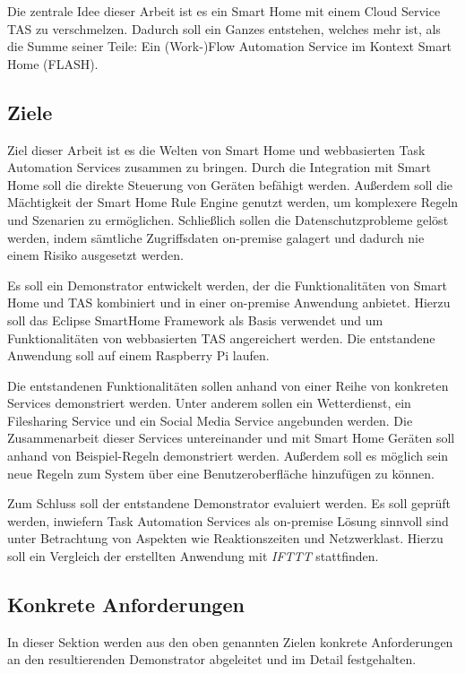 Die zentrale Idee dieser Arbeit ist es ein Smart Home mit einem Cloud Service TAS zu verschmelzen. Dadurch soll ein Ganzes entstehen, welches mehr ist, als die Summe seiner Teile: Ein (Work-)Flow Automation Service im Kontext Smart Home (FLASH).

\subsection{Ziele}
\label{sec:ziele}
Ziel dieser Arbeit ist es die Welten von Smart Home und webbasierten Task Automation Services zusammen zu bringen. Durch die Integration mit Smart Home soll die direkte Steuerung von Geräten befähigt werden. Außerdem soll die Mächtigkeit der Smart Home Rule Engine genutzt werden, um komplexere Regeln und Szenarien zu ermöglichen. Schließlich sollen die Datenschutzprobleme gelöst werden, indem sämtliche Zugriffsdaten on-premise galagert und dadurch nie einem Risiko ausgesetzt werden.

Es soll ein Demonstrator entwickelt werden, der die Funktionalitäten von Smart Home und TAS kombiniert und in einer on-premise Anwendung anbietet. Hierzu soll das Eclipse SmartHome Framework als Basis verwendet und um Funktionalitäten von webbasierten TAS angereichert werden. Die entstandene Anwendung soll auf einem Raspberry Pi laufen.

Die entstandenen Funktionalitäten sollen anhand von einer Reihe von konkreten Services demonstriert werden. Unter anderem sollen ein Wetterdienst, ein Filesharing Service und ein Social Media Service angebunden werden. Die Zusammenarbeit dieser Services untereinander und mit Smart Home Geräten soll anhand von Beispiel-Regeln demonstriert werden. Außerdem soll es möglich sein neue Regeln zum System über eine Benutzeroberfläche hinzufügen zu können.

Zum Schluss soll der entstandene Demonstrator evaluiert werden. Es soll geprüft werden, inwiefern Task Automation Services als on-premise Lösung sinnvoll sind unter Betrachtung von Aspekten wie Reaktionszeiten und Netzwerklast. Hierzu soll ein Vergleich der erstellten Anwendung mit \textit{IFTTT} stattfinden.

\subsection{Konkrete Anforderungen}
\label{sec:anforderungen}
In dieser Sektion werden aus den oben genannten Zielen konkrete Anforderungen an den resultierenden Demonstrator abgeleitet und im Detail festgehalten.

